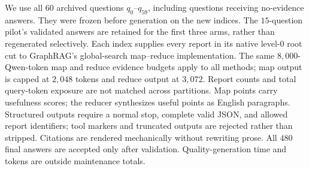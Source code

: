  We use all $60$ archived
questions $q_0$--$q_{59}$, including questions receiving no-evidence answers.
They were frozen before generation on the new indices. The $15$-question
pilot's validated answers are retained for the first three arms, rather than
regenerated selectively. Each index supplies every report in its native
level-$0$ root cut to GraphRAG's global-search map--reduce implementation.
The same $8{,}000$-Qwen-token map and reduce evidence budgets apply to all
methods; map output is capped at $2{,}048$ tokens and reduce output at
$3{,}072$. Report counts and total query-token exposure are not matched across
partitions. Map points carry usefulness scores; the reducer synthesizes useful
points as English paragraphs. Structured outputs require a normal stop,
complete valid JSON, and allowed report identifiers; tool markers and truncated
outputs are rejected rather than stripped. Citations are rendered mechanically
without rewriting prose. All $480$ final answers are accepted only after
validation. Quality-generation time and tokens are outside maintenance totals.

